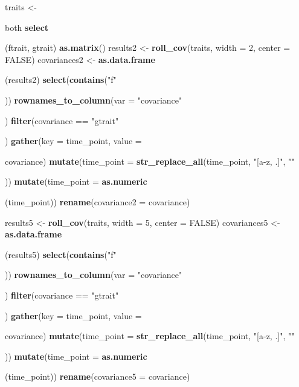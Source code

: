 \documentclass[]{article}
\newenvironment{Shaded}{\begin{snugshade}}{\end{snugshade}}
\newcommand{\KeywordTok}[1]{\textcolor[rgb]{0.13,0.29,0.53}{\textbf{{#1}}}}
\newcommand{\DataTypeTok}[1]{\textcolor[rgb]{0.13,0.29,0.53}{{#1}}}
\newcommand{\DecValTok}[1]{\textcolor[rgb]{0.00,0.00,0.81}{{#1}}}
\newcommand{\StringTok}[1]{\textcolor[rgb]{0.31,0.60,0.02}{{#1}}}
\newcommand{\OtherTok}[1]{\textcolor[rgb]{0.56,0.35,0.01}{{#1}}}
\newcommand{\NormalTok}[1]{{#1}}
\begin{document}
\begin{Shaded}
\begin{Highlighting}[]
\NormalTok{traits <-}\StringTok{ }\NormalTok{both %>%}\StringTok{ }
\StringTok{    }\KeywordTok{select}\NormalTok{(ftrait, gtrait) %>%}\StringTok{ }
\StringTok{    }\KeywordTok{as.matrix}\NormalTok{()}
\NormalTok{results2 <-}\StringTok{ }\KeywordTok{roll_cov}\NormalTok{(traits, }\DataTypeTok{width =} \DecValTok{2}\NormalTok{, }\DataTypeTok{center =} \OtherTok{FALSE}\NormalTok{)}
\NormalTok{covariances2 <-}\StringTok{ }\KeywordTok{as.data.frame}\NormalTok{(results2) %>%}\StringTok{ }
\StringTok{    }\KeywordTok{select}\NormalTok{(}\KeywordTok{contains}\NormalTok{(}\StringTok{"f"}\NormalTok{)) %>%}\StringTok{ }
\StringTok{    }\KeywordTok{rownames_to_column}\NormalTok{(}\DataTypeTok{var =} \StringTok{"covariance"}\NormalTok{) %>%}\StringTok{ }
\StringTok{    }\KeywordTok{filter}\NormalTok{(covariance ==}\StringTok{ "gtrait"}\NormalTok{) %>%}\StringTok{ }
\StringTok{    }\KeywordTok{gather}\NormalTok{(}\DataTypeTok{key =} \NormalTok{time_point, }\DataTypeTok{value =} \NormalTok{covariance) %>%}\StringTok{ }
\StringTok{    }\KeywordTok{mutate}\NormalTok{(}\DataTypeTok{time_point =} \KeywordTok{str_replace_all}\NormalTok{(time_point, }\StringTok{"[a-z, .]"}\NormalTok{, }\StringTok{""}\NormalTok{)) %>%}\StringTok{ }
\StringTok{    }\KeywordTok{mutate}\NormalTok{(}\DataTypeTok{time_point =} \KeywordTok{as.numeric}\NormalTok{(time_point)) %>%}\StringTok{ }
\StringTok{    }\KeywordTok{rename}\NormalTok{(}\DataTypeTok{covariance2 =} \NormalTok{covariance)}

\NormalTok{results5 <-}\StringTok{ }\KeywordTok{roll_cov}\NormalTok{(traits, }\DataTypeTok{width =} \DecValTok{5}\NormalTok{, }\DataTypeTok{center =} \OtherTok{FALSE}\NormalTok{)}
\NormalTok{covariances5 <-}\StringTok{ }\KeywordTok{as.data.frame}\NormalTok{(results5) %>%}\StringTok{ }
\StringTok{    }\KeywordTok{select}\NormalTok{(}\KeywordTok{contains}\NormalTok{(}\StringTok{"f"}\NormalTok{)) %>%}\StringTok{ }
\StringTok{    }\KeywordTok{rownames_to_column}\NormalTok{(}\DataTypeTok{var =} \StringTok{"covariance"}\NormalTok{) %>%}\StringTok{ }
\StringTok{    }\KeywordTok{filter}\NormalTok{(covariance ==}\StringTok{ "gtrait"}\NormalTok{) %>%}\StringTok{ }
\StringTok{    }\KeywordTok{gather}\NormalTok{(}\DataTypeTok{key =} \NormalTok{time_point, }\DataTypeTok{value =} \NormalTok{covariance) %>%}\StringTok{ }
\StringTok{    }\KeywordTok{mutate}\NormalTok{(}\DataTypeTok{time_point =} \KeywordTok{str_replace_all}\NormalTok{(time_point, }\StringTok{"[a-z, .]"}\NormalTok{, }\StringTok{""}\NormalTok{)) %>%}\StringTok{ }
\StringTok{    }\KeywordTok{mutate}\NormalTok{(}\DataTypeTok{time_point =} \KeywordTok{as.numeric}\NormalTok{(time_point)) %>%}\StringTok{ }
\StringTok{    }\KeywordTok{rename}\NormalTok{(}\DataTypeTok{covariance5 =} \NormalTok{covariance)}

}}}}}}}}}}}}}}}}
\end{Highlighting}
\end{Shaded}
\end{document}
